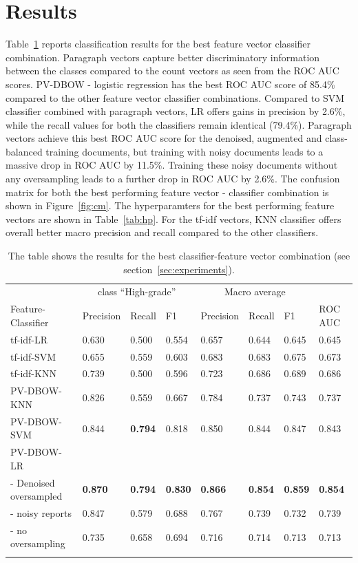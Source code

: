 \documentclass[runningheads]{llncs}
\begin{document}
\section{Results}
\label{sec:results}
%
Table~\ref{tab:results} reports classification results for the best feature vector classifier combination.
Paragraph vectors capture better discriminatory information between the classes compared to the count vectors as seen from the ROC AUC scores.
PV-DBOW - logistic regression has the best ROC AUC score of 85.4\% compared to the other feature vector classifier combinations.
Compared to SVM classifier combined with paragraph vectors, LR offers gains in precision by 2.6\%, while the recall values for both the classifiers remain identical (79.4\%).
Paragraph vectors achieve this best ROC AUC score for the denoised, augmented and class-balanced training documents, but training with noisy documents leads to a massive drop in ROC AUC by 11.5\%.
Training these noisy documents without any oversampling leads to a further drop in ROC AUC by 2.6\%.
The confusion matrix for both the best performing feature vector - classifier combination is shown in Figure~\ref{fig:cm}. 
The hyperparamters for the best performing feature vectors are shown in Table~\ref{tab:hp}.
For the tf-idf vectors, KNN classifier offers overall better macro precision and recall compared to the other classifiers.
%
\begin{table}[]
    \centering
    \caption{The table shows the results for the best classifier-feature vector combination (see section~\ref{sec:experiments}).}
    \begin{tabular}{ p{3.5cm}m{1.5cm}m{1cm}m{1cm}m{1.5cm}m{1cm}m{1cm}m{1cm}  }
    \Xhline{1pt}
      & \multicolumn{3}{c}{class ``High-grade''} & \multicolumn{3}{c}{Macro average} & \\
    \Xhline{1pt}
     Feature-Classifier & Precision & Recall & F1 & Precision & Recall & F1 &  ROC AUC \\
    \Xhline{1pt}
     tf-idf-LR & 0.630 & 0.500 & 0.554 & 0.657 & 0.644 & 0.645 & 0.645 \\
     tf-idf-SVM & 0.655 & 0.559 & 0.603 & 0.683 & 0.683 & 0.675 & 0.673 \\
     tf-idf-KNN & 0.739 & 0.500 & 0.596 & 0.723  & 0.686 & 0.689 & 0.686 \\
     PV-DBOW-KNN & 0.826 & 0.559 & 0.667 & 0.784 & 0.737 & 0.743 & 0.737 \\
     PV-DBOW-SVM & 0.844 & \textbf{0.794} & 0.818 & 0.850 & 0.844 & 0.847 & 0.843 \\
     PV-DBOW-LR &  &  &  &  &  &  & \\
     - Denoised oversampled & \textbf{0.870} & \textbf{0.794} & \textbf{0.830} & \textbf{0.866} & \textbf{0.854} & \textbf{0.859} & \textbf{0.854} \\
     - noisy reports & 0.847 & 0.579 & 0.688 & 0.767 & 0.739 & 0.732 & 0.739 \\
     - no oversampling & 0.735 & 0.658 & 0.694 & 0.716 & 0.714 & 0.713 & 0.713 \\
    \Xhline{1pt}
    \end{tabular}
    \label{tab:results}
\end{table}
\end{document}
